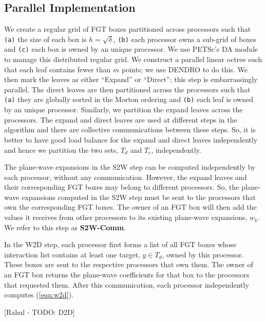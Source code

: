 
\subsection{Parallel Implementation}
\label{sc:parallelnufgt}

We create a regular grid of FGT boxes partitioned across processors such that 
 {\tt{(a)}} the size of each box is $h = \sqrt{\delta}$, {\tt{(b)}} each processor owns a sub-grid of boxes and
 {\tt{(c)}} each box is owned by an unique processor.  We use PETSc's \cite{petsc-user-ref, petsc-home-page} DA
 module to manage this distributed regular grid. We construct a parallel linear octree such that each leaf
 contains fewer than $m$ points; we use DENDRO \cite{dendro} to do this. We then mark the leaves as either
 ``Expand'' or ``Direct''; this step is embarrassingly parallel. The direct leaves are then partitioned across 
 the processors such that {\tt{(a)}} they are globally sorted in the Morton ordering and {\tt{(b)}} each leaf 
 is owned by an unique processor. Similarly, we partition the expand leaves across the processors. The expand
 and direct leaves are used at different steps in the algorithm and there are collective communications between
 these steps. So, it is better to have good load balance for the expand and direct leaves independently and hence
 we partition the two sets, $T_d$ and $T_e$, independently.

The plane-wave expansions in the S2W step can be computed independently by each processor, without any communication.
However, the expand leaves and their corresponding FGT boxes may belong to different processors. So, the plane-wave 
expansions computed in the S2W step must be sent to the processors that own the corresponding FGT boxes. The owner of
an FGT box will then add the values it receives from other processors to its existing plane-wave expansions, $w_k$. We 
refer to this step as {\textbf{S2W-Comm}}.

In the W2D step, each processor first forms a list of all FGT boxes whose interaction list contains at least one 
target, $y \in T_d$, owned by this processor. These boxes are sent to the respective processors that own them. The
owner of an FGT box returns the plane-wave coefficients for that box to the processors that requested them. After this
communication, each processor independently computes (\ref{eqn:w2d}).

[Rahul - TODO: D2D]

